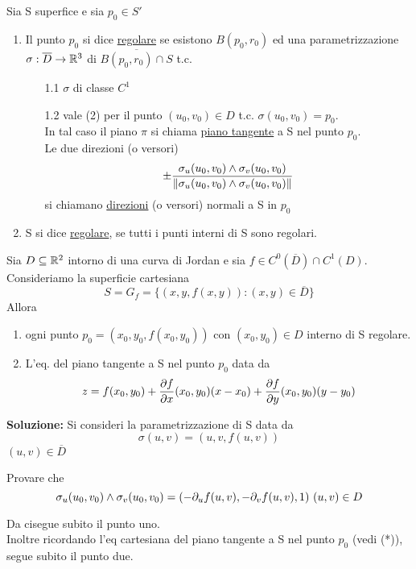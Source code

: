 \begin{definition}
  Sia S superfice e sia $p_0\in S'$
  \begin{enumerate}
    \item Il punto $p_0$ si dice \underline{regolare} se esistono 
          $B(p_0,r_0)$ ed una parametrizzazione $\sigma:\overline{D}\to\mathbb{R}^3$ di 
          $\overline{B(p_0,r_0)\cap S}$ t.c. 
          \begin{enumerate}
            \item[1.1] $\sigma$ \ace di classe $C^1$
            \item[1.2] vale (2) per il punto $(u_0,v_0)\in D$ t.c. $\sigma(u_0,v_0)=p_0$.\\
                        In tal caso il piano $\pi$ si chiama \underline{piano tangente}
                        a S nel punto $p_0$.\\
                        Le due direzioni (o versori)
                        $$\pm \frac{\sigma_u(u_0,v_0)\wedge\sigma_v(u_0,v_0)}
                                {\left\lVert\sigma_u(u_0,v_0)\wedge \sigma_v(u_0,v_0)\right\rVert}$$
                        si chiamano \underline{direzioni} (o versori) normali a S in $p_0$
          \end{enumerate}
    \item S si dice \underline{regolare}, se tutti i punti interni di S sono regolari.
  \end{enumerate}
\end{definition}
\begin{osservazione}
  Sia $D\subseteq\mathbb{R}^2$ intorno di una curva di Jordan e sia $f\in C^0(\overline{D})\cap C^1(D)$. 
  Consideriamo la superficie cartesiana
  $$S=G_f = \{(x,y,f(x,y)) : (x,y) \in \overline{D}\}$$
  Allora 
  \begin{exercise}
    \begin{enumerate}
      \item ogni punto $p_0 = (x_0,y_0,f(x_0,y_0))$ con $(x_0,y_0)\in D$ \ace interno di S regolare.
      \item L'eq. del piano tangente a S nel punto $p_0$ \ace data da 
            $$z = f(x_0,y_0) + \frac{\partial f}{\partial x}(x_0,y_0) (x-x_0) + \frac{\partial f}{\partial y}(x_0,y_0)(y-y_0)$$
    \end{enumerate}
    \textbf{Soluzione:} Si consideri la parametrizzazione di S data da 
    $$\sigma(u,v) = (u,v,f(u,v))$$
    $(u,v)\in\overline{D}$
    \begin{exercise}
      Provare che
      $$\sigma_u(u_0,v_0) \wedge \sigma_v(u_0,v_0) = \left(-\partial_u f(u,v), -\partial_v f(u,v), 1\right) \, (u,v)\in D$$
    \end{exercise}
    Da ci\aco segue subito il punto uno. \\ 
    Inoltre ricordando l'eq cartesiana del piano tangente a S nel punto $p_0$ (vedi (*)), segue 
    subito il punto due. 
  \end{exercise}
\end{osservazione}